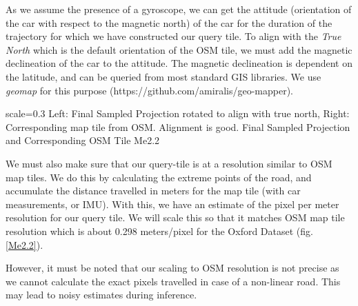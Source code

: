 As we assume the presence of a gyroscope, we can get the attitude (orientation of the car with respect to the magnetic north) of the car for the duration of the trajectory for which we have constructed our query tile. To align with the \textit{True North} which is the default orientation of the OSM tile, we must add the magnetic declineation of the car to the attitude. The magnetic declineation is dependent on the latitude, and can be queried from most standard GIS libraries. We use \textit{geomap} for this purpose (https://github.com/amiralis/geo-mapper).

{scale=0.3}%
{Left: Final Sampled Projection rotated to align with true north, Right: Corresponding map tile from OSM. Alignment is good.}%
{Final Sampled Projection and Corresponding OSM Tile}%
{Me2.2}

We must also make sure that our query-tile is at a resolution similar to OSM map tiles. We do this by calculating the extreme points of the road, and accumulate the distance travelled in meters for the map tile (with car measurements, or IMU). With this, we have an estimate of the pixel per meter resolution for our query tile. We will scale this so that it matches OSM map tile resolution which is about 0.298 meters/pixel for the Oxford Dataset (fig. \ref{Me2.2}).

However, it must be noted that our scaling to OSM resolution is not precise as we cannot calculate the exact pixels travelled in case of a non-linear road. This may lead to noisy estimates during inference. 














































































